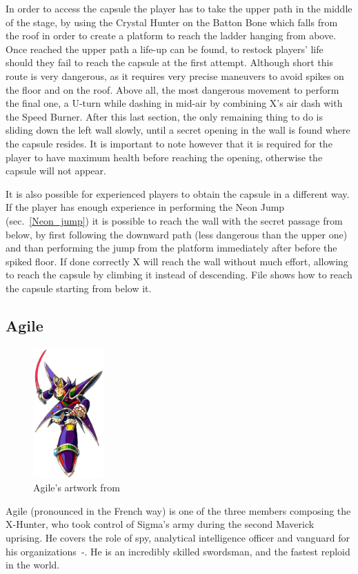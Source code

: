 In order to access the capsule the player has to take the upper path in the middle of the stage, by using the Crystal Hunter  on the Batton Bone which falls from the roof in order to create a platform to reach the ladder hanging from above. Once reached the upper path a life-up can be found, to restock players' life should they fail to reach the capsule at the first attempt. Although short this route is very dangerous, as it requires very precise maneuvers to avoid spikes on the floor and on the roof. Above all, the most dangerous movement to perform the final one, a U-turn while dashing in mid-air by combining X's air dash with the Speed Burner. After this last section, the only remaining thing to do is sliding down the left wall slowly, until a secret opening in the wall is found where the capsule resides. It is important to note however that it is required for the player to have maximum health before reaching the opening, otherwise the capsule will not appear.

It is also possible for experienced players to obtain the capsule in a different way. If the player has enough experience in performing the Neon Jump (sec.~\ref{Neon_jump}) it is possible to reach the wall with the secret passage from below, by first following the downward path (less dangerous than the upper one) and than performing the jump from the platform immediately after before the spiked floor. If done correctly X will reach the wall without much effort, allowing to reach the capsule by climbing it instead of descending. File  shows how to reach the capsule starting from below it.

\subsection{Agile}\label{boss:Agile}
\begin{figure}[htp]
	\centering
	\includegraphics[height=5cm]{figures/X2/Hunter_stages/Agile.png}
	\caption{Agile's artwork from~\cite{book:MMX_Complete_art}}
\end{figure}
Agile (pronounced in the French way) is one of the three members composing the X-Hunter, who took control of Sigma's army during the second Maverick uprising. He covers the role of spy, analytical intelligence officer and vanguard for his organizations~\cite{MHX:manual}-\cite{wayback:X2_resources}. He is an incredibly skilled swordsman, and the fastest reploid in the world. 

